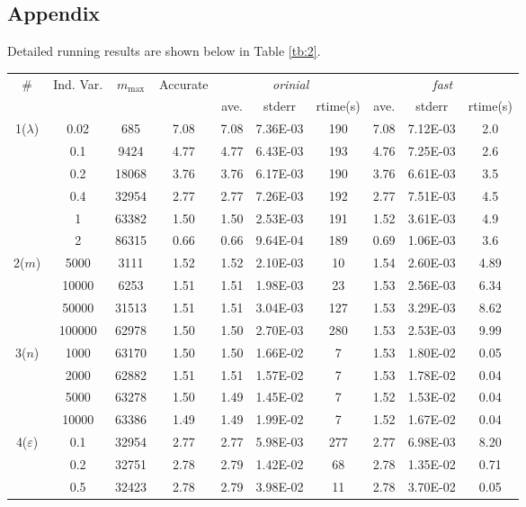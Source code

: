 \documentclass{scrartcl}
\begin{document}
\subsection*{Appendix} %
\label{sub:appendix}
Detailed running results are shown below in Table \ref{tb:2}.
\begin{table}[h]
\centering
\begin{tabularx}{\textwidth}{c|c|c|c|ccc|ccc}
\toprule
\# & Ind. Var. & $m_{\max} $ & Accurate & \multicolumn{3}{c}{\emph{orinial}} & \multicolumn{3}{c}{\emph{fast}} \\
 &  &  &  & ave. & stderr & rtime(s) & ave. & stderr & rtime(s) \\
\midrule
1($\lambda$) & 0.02 & 685 & 7.08 & 7.08& 7.36E-03 & 190 & 7.08 & 7.12E-03 & 2.0 \\
 & 0.1 & 9424 & 4.77 & 4.77 & 6.43E-03 & 193 & 4.76 & 7.25E-03 & 2.6 \\
 & 0.2 & 18068 & 3.76 & 3.76 & 6.17E-03 & 190 & 3.76 & 6.61E-03 & 3.5 \\
 & 0.4 & 32954 & 2.77 & 2.77 & 7.26E-03 & 192 & 2.77 & 7.51E-03 & 4.5 \\
 & 1 & 63382 & 1.50 & 1.50 & 2.53E-03 & 191 & 1.52 & 3.61E-03 & 4.9 \\
 & 2 & 86315 & 0.66 & 0.66 & 9.64E-04 & 189 & 0.69 & 1.06E-03 & 3.6 \\
\midrule
2($m$) & 5000 & 3111 & 1.52 & 1.52 & 2.10E-03 & 10 & 1.54 & 2.60E-03 & 4.89\\
 & 10000 & 6253 & 1.51 & 1.51 & 1.98E-03 & 23 & 1.53 & 2.56E-03 & 6.34\\
 & 50000 & 31513 & 1.51 & 1.51 & 3.04E-03 & 127 & 1.53 & 3.29E-03 & 8.62\\
 & 100000 & 62978 & 1.50 & 1.50 & 2.70E-03 & 280 & 1.53 & 2.53E-03 & 9.99\\
\midrule
3($n$) & 1000 & 63170 & 1.50 & 1.50 & 1.66E-02 & 7 & 1.53 & 1.80E-02 & 0.05 \\
 & 2000 & 62882 & 1.51 & 1.51 & 1.57E-02 & 7 & 1.53 & 1.78E-02 & 0.04\\
 & 5000 & 63278 & 1.50 & 1.49 & 1.45E-02 & 7 & 1.52 & 1.53E-02 & 0.04\\
 & 10000 & 63386 & 1.49 & 1.49 & 1.99E-02 & 7 & 1.52 & 1.67E-02 & 0.04\\
\midrule
4($\varepsilon$) & 0.1 & 32954 & 2.77 & 2.77 & 5.98E-03 & 277 & 2.77 & 6.98E-03 & 8.20\\
 & 0.2 & 32751 & 2.78 & 2.79 & 1.42E-02 & 68 & 2.78 & 1.35E-02 & 0.71\\
 & 0.5 & 32423 & 2.78 & 2.79 & 3.98E-02 & 11 & 2.78 & 3.70E-02 & 0.05\\

\end{tabularx}
\end{table}
\end{document}
